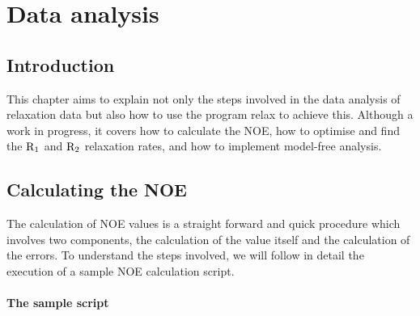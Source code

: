 
\chapter{Data analysis}




\section{Introduction}

This chapter aims to explain not only the steps involved in the data analysis of relaxation data but also how to use the program relax to achieve this.  Although a work in progress, it covers how to calculate the NOE, how to optimise and find the $\mathrm{R}_1$ and $\mathrm{R}_2$ relaxation rates, and how to implement model-free analysis.



\section{Calculating the NOE}

The calculation of NOE values is a straight forward and quick procedure which involves two components, the calculation of the value itself and the calculation of the errors.  To understand the steps involved, we will follow in detail the execution of a sample NOE calculation script.


\subsubsection{The sample script}

